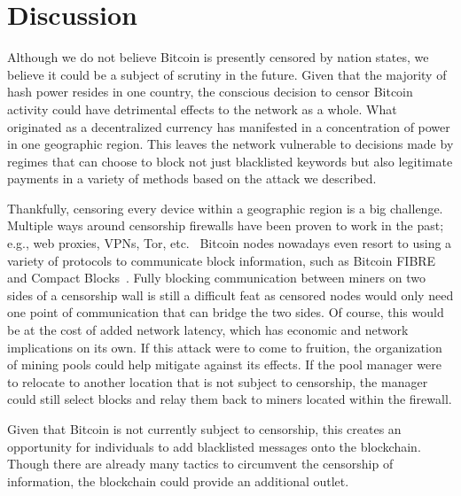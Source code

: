 \section{Discussion}
Although we do not believe Bitcoin is presently censored by nation states, we believe it could be a subject of scrutiny in the future. Given that the majority of hash power resides in one country, the conscious decision to censor Bitcoin activity could have detrimental effects to the network as a whole. What originated as a decentralized currency has manifested in a concentration of power in one geographic region. This leaves the network vulnerable to decisions made by regimes that can choose to block not just blacklisted keywords but also legitimate payments in a variety of methods based on the attack we described.

Thankfully, censoring every device within a geographic region is a big challenge. Multiple ways around censorship firewalls have been proven to work in the past; e.g., web proxies, VPNs, Tor, etc.~\cite{ignoring} Bitcoin nodes nowadays even resort to using a variety of protocols to communicate block information, such as Bitcoin FIBRE~\cite{fibre} and Compact Blocks~\cite{compact-blocks}. Fully blocking communication between miners on two sides of a censorship wall is still a difficult feat as censored nodes would only need one point of communication that can bridge the two sides. Of course, this would be at the cost of added network latency, which has economic and network implications on its own. If this attack were to come to fruition, the organization of mining pools could help mitigate against its effects. If the pool manager were to relocate to another location that is not subject to censorship, the manager could still select blocks and relay them back to miners located within the firewall.

Given that Bitcoin is not currently subject to censorship, this creates an opportunity for individuals to add blacklisted messages onto the blockchain. Though there are already many tactics to circumvent the censorship of information, the blockchain could provide an additional outlet.
